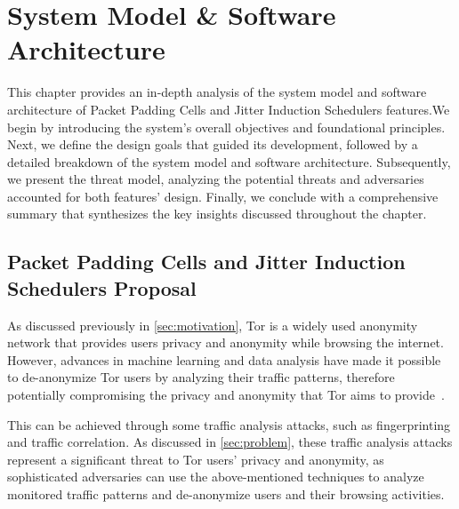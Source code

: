 
%

\makeatletter
\newcommand{\ntifpkgloaded}{%
  \@ifpackageloaded%
}
\makeatother


\chapter{System Model \& Software Architecture}\label{cha:system_model}

This chapter provides an in-depth analysis of the system model and software architecture of Packet Padding Cells and Jitter Induction Schedulers features.\@ We begin by introducing the system's overall objectives and foundational principles. Next, we define the design goals that guided its development, followed by a detailed breakdown of the system model and software architecture. Subsequently, we present the threat model, analyzing the potential threats and adversaries accounted for both features' design. Finally, we conclude with a comprehensive summary that synthesizes the key insights discussed throughout the chapter.

\section{Packet Padding Cells and Jitter Induction Schedulers Proposal}\label{sec:system_propostal}

As discussed previously in \autoref{sec:motivation}, Tor is a widely used anonymity network that provides users privacy and anonymity while browsing the internet. However, advances in machine learning and data analysis have made it possible to de-anonymize Tor users by analyzing their traffic patterns, therefore potentially  compromising the privacy and anonymity that Tor aims to provide~\cite{chakravarty2014trafficanalysis, johnson2013users,winter2012great,robjansen2019dosontor}. 

This can be achieved through some traffic analysis attacks, such as fingerprinting and traffic correlation. As discussed in \autoref{sec:problem}, these traffic analysis attacks represent a significant threat to Tor users' privacy and anonymity, as sophisticated adversaries can use the above-mentioned techniques to analyze monitored traffic patterns and de-anonymize users and their browsing activities.

